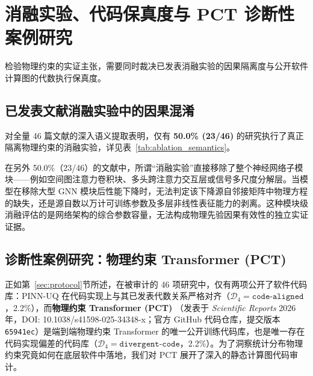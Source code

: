 \section{消融实验、代码保真度与 PCT 诊断性案例研究}
\label{sec:code_audit}

检验物理约束的实证主张，需要同时裁决已发表消融实验的因果隔离度与公开软件计算图的代数执行保真度。

\subsection{已发表文献消融实验中的因果混淆}
对全量 46 篇文献的深入语义提取表明，仅有 \textbf{50.0\% (23/46)} 的研究执行了真正隔离物理约束的消融实验，详见表~\ref{tab:ablation_semantics}。



在另外 50.0\%（23/46）的文献中，所谓“消融实验”直接移除了整个神经网络子模块——例如空间图注意力卷积块、多头跨注意力交互层或信号多尺度分解层。当模型在移除大型 GNN 模块后性能下降时，无法判定该下降源自邻接矩阵中物理方程的缺失，还是源自数以万计可训练参数及多层非线性表征能力的剥离。这种模块级消融评估的是网络架构的综合参数容量，无法构成物理先验因果有效性的独立实证证据。

\subsection{诊断性案例研究：物理约束 Transformer (PCT)}
\label{sec:pct_case}
正如第~\ref{sec:protocol}节所述，在被审计的 46 项研究中，仅有两项公开了软件代码库：PINN-UQ \cite{s10_pinnuq2025} 在代码实现上与其已发表代数关系严格对齐（$\mathcal{D}_4 = \texttt{code-aligned}$，2.2\%），而\textbf{物理约束 Transformer (PCT)} \cite{pct2026}（发表于 \textit{Scientific Reports} 2026 年，DOI: 10.1038/s41598-025-34348-x；官方 GitHub 代码仓库，提交版本 \texttt{65941ec}）是端到端物理约束 Transformer 的唯一公开训练代码库，也是唯一存在代码实现偏差的代码库（$\mathcal{D}_4 = \texttt{divergent-code}$，2.2\%）。为了洞察统计分布物理约束究竟如何在底层软件中落地，我们对 PCT 展开了深入的静态计算图代码审计。

